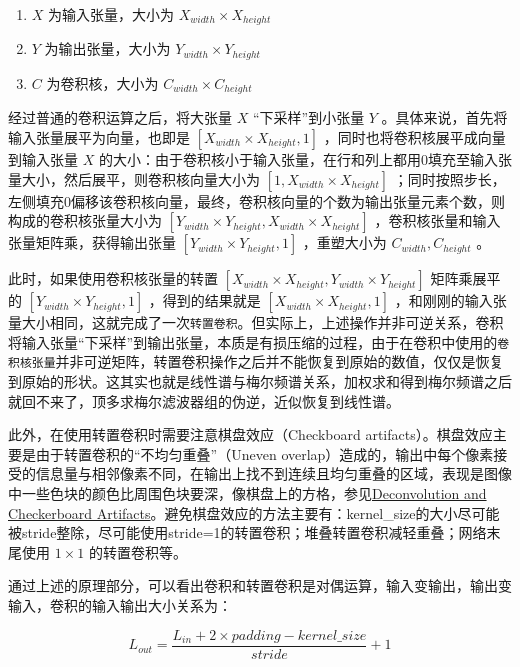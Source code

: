 \documentclass[cn,10pt,math=newtx,citestyle=gb7714-2015,bibstyle=gb7714-2015]{elegantbook}
\begin{document}
\begin{enumerate}
  \item $X$ 为输入张量，大小为 $X_{width}\times X_{height}$ 
  \item $Y$ 为输出张量，大小为 $Y_{width}\times Y_{height}$ 
  \item $C$ 为卷积核，大小为 $C_{width}\times C_{height}$ 
\end{enumerate}

经过普通的卷积运算之后，将大张量 $X$ “下采样”到小张量 $Y$ 。具体来说，首先将输入张量展平为向量，也即是 $[X_{width}\times X_{height},1]$ ，同时也将卷积核展平成向量到输入张量 $X$ 的大小：由于卷积核小于输入张量，在行和列上都用0填充至输入张量大小，然后展平，则卷积核向量大小为 $[1,X_{width}\times X_{height}]$ ；同时按照步长，左侧填充0偏移该卷积核向量，最终，卷积核向量的个数为输出张量元素个数，则构成的卷积核张量大小为 $[Y_{width}\times Y_{height},X_{width}\times X_{height}]$ ，卷积核张量和输入张量矩阵乘，获得输出张量 $[Y_{width}\times Y_{height},1]$ ，重塑大小为 $C_{width},C_{height}$ 。

此时，如果使用卷积核张量的转置 $[X_{width}\times X_{height},Y_{width}\times Y_{height}]$ 矩阵乘展平的 $[Y_{width}\times Y_{height},1]$ ，得到的结果就是 $[X_{width}\times X_{height},1]$ ，和刚刚的输入张量大小相同，这就完成了一次\lstinline{转置卷积}。但实际上，上述操作并非可逆关系，卷积将输入张量“下采样”到输出张量，本质是有损压缩的过程，由于在卷积中使用的\lstinline{卷积核张量}并非可逆矩阵，转置卷积操作之后并不能恢复到原始的数值，仅仅是恢复到原始的形状。这其实也就是线性谱与梅尔频谱关系，加权求和得到梅尔频谱之后就回不来了，顶多求梅尔滤波器组的伪逆，近似恢复到线性谱。

此外，在使用转置卷积时需要注意棋盘效应（Checkboard artifacts）。棋盘效应主要是由于转置卷积的“不均匀重叠”（Uneven overlap）造成的，输出中每个像素接受的信息量与相邻像素不同，在输出上找不到连续且均匀重叠的区域，表现是图像中一些色块的颜色比周围色块要深，像棋盘上的方格，参见\href{https://distill.pub/2016/deconv-checkerboard}{Deconvolution and Checkerboard Artifacts}。避免棋盘效应的方法主要有：kernel\_size的大小尽可能被stride整除，尽可能使用stride=1的转置卷积；堆叠转置卷积减轻重叠；网络末尾使用 $1\times 1$ 的转置卷积等。

通过上述的原理部分，可以看出卷积和转置卷积是对偶运算，输入变输出，输出变输入，卷积的输入输出大小关系为：

\begin{equation}
  L_{out}=\frac{L_{in}+2\times padding-kernel\_size}{stride}+1
\end{equation}
\end{document}
